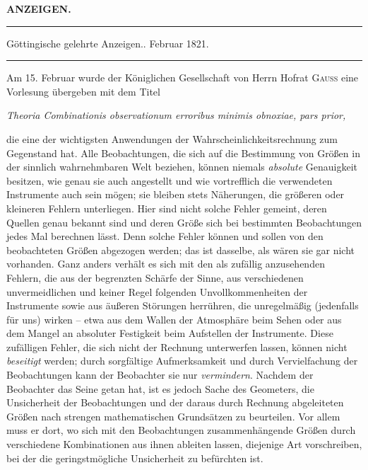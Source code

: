 \clearpage
{}
\begin{center}
{\Large\bfseries ANZEIGEN.}\par
\vspace{1.8em}
\rule{.88\textwidth}{.3pt}\par
Göttingische gelehrte Anzeigen.. Februar 1821.\par
\rule{.88\textwidth}{.3pt}
\end{center}

Am 15. Februar wurde der Königlichen Gesellschaft von Herrn Hofrat \textsc{Gauss} eine Vorlesung übergeben mit dem Titel
\begin{center}
\textit{Theoria Combinationis observationum erroribus minimis obnoxiae, pars prior,}
\end{center}
\noindent die eine der wichtigsten Anwendungen der Wahrscheinlichkeitsrechnung zum Gegenstand hat. Alle Beobachtungen, die sich auf die Bestimmung von Größen in der sinnlich wahrnehmbaren Welt beziehen, können niemals \textit{absolute} Genauigkeit besitzen, wie genau sie auch angestellt und wie vortrefflich die verwendeten Instrumente auch sein mögen; sie bleiben stets Näherungen, die größeren oder kleineren Fehlern unterliegen. Hier sind nicht solche Fehler gemeint, deren Quellen genau bekannt sind und deren Größe sich bei bestimmten Beobachtungen jedes Mal berechnen lässt. Denn solche Fehler können und sollen von den beobachteten Größen abgezogen werden; das ist dasselbe, als wären sie gar nicht vorhanden. Ganz anders verhält es sich mit den als zufällig anzusehenden Fehlern, die aus der begrenzten Schärfe der Sinne, aus verschiedenen unvermeidlichen und keiner Regel folgenden Unvollkommenheiten der Instrumente sowie aus äußeren Störungen herrühren, die unregelmäßig (jedenfalls für uns) wirken – etwa aus dem Wallen der Atmosphäre beim Sehen oder aus dem Mangel an absoluter Festigkeit beim Aufstellen der Instrumente. Diese zufälligen Fehler, die
sich nicht der Rechnung unterwerfen lassen, können nicht \textit{beseitigt} werden; durch sorgfältige Aufmerksamkeit und durch Vervielfachung der Beobachtungen kann der Beobachter sie nur \textit{vermindern}. Nachdem der Beobachter das Seine getan hat, ist es jedoch Sache des Geometers, die Unsicherheit der Beobachtungen und der daraus durch Rechnung abgeleiteten Größen nach strengen mathematischen Grundsätzen zu beurteilen. Vor allem muss er dort, wo sich mit den Beobachtungen zusammenhängende Größen durch verschiedene Kombinationen aus ihnen ableiten lassen, diejenige Art vorschreiben, bei der die geringstmögliche Unsicherheit zu befürchten ist.

